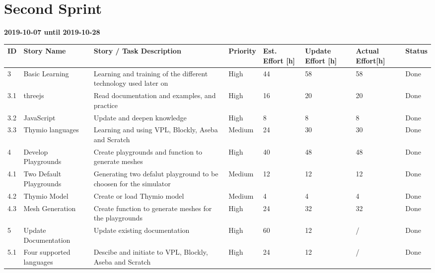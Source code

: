 \documentclass{scrbook}
\begin{document}
\section{Second Sprint}
\textbf{2019-10-07 until 2019-10-28}
\begin{longtable}{p{5mm}|p{2cm}|p{4cm}|p{1cm}|p{1cm}|p{1cm}|p{1cm}|p{15mm}}
  ID                     & Story Name & Story / Task Description & Priority & Est. Effort {[}h{]} & Update Effort {[}h{]} & Actual Effort{[}h{]} & Status                \\ \hline
  3 & Basic Learning & Learning and training of the different technology used later on & High & 44 & 58 & 58 & Done \\
  3.1 & threejs & Read documentation and examples, and practice & High & 16 & 20 & 20 & Done \\ 
  3.2 & JavaScript & Update and deepen knowledge  & High & 8 & 8 & 8 & Done \\ 
  3.3 & Thymio languages & Learning and using VPL, Blockly, Aseba and Scratch & Medium & 24 & 30 & 30 & Done \\ 
  4 & Develop Playgrounds & Create playgrounds and function to generate meshes & High & 40 & 48 & 48 & Done \\ 
  4.1 & Two Default Playgrounds & Generating two defalut playground to be choosen for the simulator & Medium & 12 & 12 & 12 & Done \\ 
  4.2 & Thymio Model & Create or load Thymio model & Medium & 4 & 4 & 4 & Done \\ 
  4.3 & Mesh Generation & Create function to generate meshes for the playgrounds & High & 24 & 32 & 32 & Done \\ 
  5 & Update Documentation & Update existing documentation & High & 60 & 12 & {/} & Done \\
  5.1 & Four supported languages & Descibe and initiate to VPL, Blockly, Aseba and Scratch & High & 24 & 12 & {/} & Done \\ 
\end{longtable}
\end{document}
